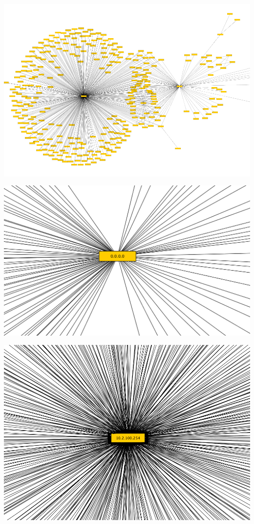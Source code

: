 \begin{center}
\includegraphics[scale=0.5,clip=true,trim=140 0 0 0]{graphics/distinguidos.png}

\includegraphics[scale=0.3,clip=true,trim=140 0 0 0]{graphics/distinguido_todos_ceros.png}

\includegraphics[scale=0.3,clip=true,trim=140 0 0 0]{graphics/distinguido_router.png}
\end{center}

